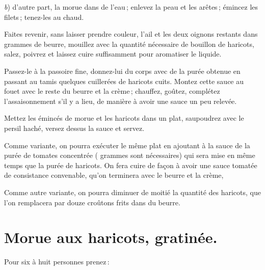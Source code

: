 \textit{b}) d'autre part, la morue dans de l'eau ; enlevez la peau et les
arêtes ; émincez les filets ; tenez-les au chaud.

Faites revenir, sans laisser prendre couleur, l'ail et les deux oignons restants
dans {\mmm} grammes de beurre, mouillez avec la quantité nécessaire de bouillon
de haricots, salez, poivrez et laissez cuire suffisamment pour aromatiser le
liquide.

Passez-le à la passoire fine, donnez-lui du corps avec de la purée obtenue en
passant au tamis quelques cuillerées de haricots cuits. Montez cette sauce au
fouet avec le reste du beurre et la crème ; chauffez, goûtez, complétez
l'assaisonnement s'il y a lieu, de manière à avoir une sauce un peu relevée.

Mettez les émincés de morue et les haricots dans un plat, saupoudrez avec le
persil haché, versez dessus la sauce et servez.

\sk

Comme variante, on pourra exécuter le même plat en ajoutant à la sauce de la
purée de tomates concentrée ({\mmm} grammes sont nécessaires) qui sera mise en
même temps que la purée de haricots. On fera cuire de façon à avoir une sauce
tomatée de consistance convenable, qu'on terminera avec le beurre et la crème,

\sk

Comme autre variante, on pourra diminuer de moitié la quantité des haricots,
que l’on remplacera par douze croûtons frits dans du beurre.

\section*{\centering Morue aux haricots, gratinée.}

Pour six à huit personnes prenez :

\medskip

